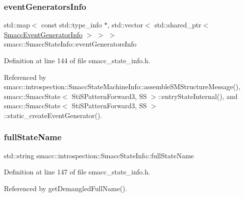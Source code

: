 \subsubsection{\texorpdfstring{event\+Generators\+Info}{eventGeneratorsInfo}}
{\footnotesize\ttfamily std\+::map$<$ const std\+::type\+\_\+info $\ast$, std\+::vector$<$ std\+::shared\+\_\+ptr$<$ \hyperlink{structsmacc_1_1introspection_1_1SmaccEventGeneratorInfo}{Smacc\+Event\+Generator\+Info} $>$ $>$ $>$ smacc\+::\+Smacc\+State\+Info\+::event\+Generators\+Info\hspace{0.3cm}{\ttfamily [static]}}



Definition at line 144 of file smacc\+\_\+state\+\_\+info.\+h.



Referenced by smacc\+::introspection\+::\+Smacc\+State\+Machine\+Info\+::assemble\+S\+M\+Structure\+Message(), smacc\+::\+Smacc\+State$<$ Sti\+S\+Pattern\+Forward3, S\+S $>$\+::entry\+State\+Internal(), and smacc\+::\+Smacc\+State$<$ Sti\+S\+Pattern\+Forward3, S\+S $>$\+::static\+\_\+create\+Event\+Generator().

\mbox{\label{classsmacc_1_1introspection_1_1SmaccStateInfo_aef6053863f757bf9af16fe4da75c51de}} 
\subsubsection{\texorpdfstring{full\+State\+Name}{fullStateName}}
{\footnotesize\ttfamily std\+::string smacc\+::introspection\+::\+Smacc\+State\+Info\+::full\+State\+Name}



Definition at line 147 of file smacc\+\_\+state\+\_\+info.\+h.



Referenced by get\+Demangled\+Full\+Name().

\mbox{\label{classsmacc_1_1introspection_1_1SmaccStateInfo_afa49a141d2ccdb3d6f9676ed380ce006}} 
